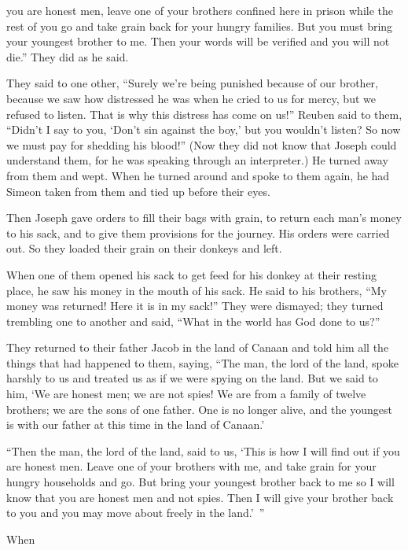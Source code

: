 {you
are honest
men, leave one
of your brothers
confined
here in prison
while the rest of you
go
and take
grain
back
for your hungry
families.
But you must bring
your youngest
brother
to
me. Then your words
will be verified
and you will not
die.”
They did
as he said.
\par }{\PP {}They said
to
one
other, “Surely
we’re
being punished
because of our brother,
because
we saw
how distressed
he was when he cried
to us for mercy,
but we refused
to listen.
That is why
this distress
has come
on
us!”
Reuben
said
to them,
“Didn’t
I say
to you, ‘Don’t
sin
against the boy,’
but you wouldn’t listen? So now
we must pay for shedding
his blood!”
(Now they
did not
know
that
Joseph
could understand
them, for
he was speaking through an interpreter.)
He turned away
from them and wept.
When he turned around
and spoke
to
them again, he had Simeon
taken
from them and tied up
before their eyes.
\par }{\PP {}Then Joseph
gave orders
to fill
their bags
with grain,
to return
each man’s
money
to
his sack,
and to give
them provisions
for the journey.
His orders were carried out.
So
they loaded
their grain
on
their donkeys
and left.
\par }{\PP {}When one
of them
opened
his sack
to get feed
for his donkey
at their resting
place, he saw
his money
in the mouth
of his sack.
He said
to
his brothers,
“My money
was returned! Here
it is in my sack!” They were dismayed;
they turned trembling
one
to
another
and said,
“What
in the world has God
done to us?”
\par }{\PP {}They returned
to
their father
Jacob
in the land
of Canaan
and told
him all
the things that had happened
to them, saying,
“The man,
the lord
of the land,
spoke
harshly
to us and treated
us as if we were spying on
the land.
But we said
to him,
‘We are honest
men; we
are not
spies!
We are from a family of twelve
brothers;
we
are the sons
of one
father.
One
is no
longer alive, and the youngest
is with
our father
at this time
in the land
of Canaan.’
\par }{\PP {}“Then the man,
the lord
of the land,
said
to us, ‘This
is how I will find out
if
you
are honest
men. Leave
one
of your brothers
with
me, and take
grain for your hungry
households
and go.
But bring
your youngest
brother
back to
me so I will know
that
you
are honest
men and not
spies.
Then
I will give
your brother
back to you
and you may move about freely
in the land.’ ”
\par }{\PP {}When
}
